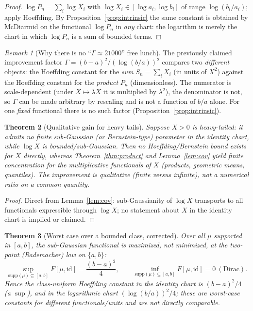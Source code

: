 \documentclass[11pt]{article}
\theoremstyle{plain}
\newtheorem{theorem}{Theorem}[section]
\theoremstyle{definition}
\theoremstyle{remark}
\newtheorem{remark}[theorem]{Remark}
\begin{document}
\begin{proof}
$\log P_n=\sum_i\log X_i$ with $\log X_i\in[\log a_i,\log b_i]$ of range
$\log(b_i/a_i)$; apply Hoeffding. By Proposition~\ref{prop:intrinsic} the same
constant is obtained by McDiarmid on the functional $\log P_n$ in \emph{any}
chart: the logarithm is merely the chart in which $\log P_n$ is a sum of bounded
terms.
\end{proof}

\begin{remark}[Why there is no ``$\Gamma\approx 21000$'' free lunch]
The previously claimed improvement factor $\Gamma=(b-a)^2/(\log(b/a))^2$ compares
two \emph{different} objects: the Hoeffding constant for the \emph{sum}
$S_n=\sum_iX_i$ (in units of $X^2$) against the Hoeffding constant for the
\emph{product} $P_n$ (dimensionless). The numerator is scale-dependent (under
$X\mapsto\lambda X$ it is multiplied by $\lambda^2$), the denominator is not, so
$\Gamma$ can be made arbitrary by rescaling and is not a function of $b/a$ alone.
For one \emph{fixed} functional there is no such factor
(Proposition~\ref{prop:intrinsic}).
\end{remark}

\begin{theorem}[Qualitative gain for heavy tails]\label{thm:heavy}
Suppose $X>0$ is heavy-tailed: it admits no finite sub-Gaussian (or
Bernstein-type) parameter in the identity chart, while $\log X$ is
bounded/sub-Gaussian. Then no Hoeffding/Bernstein bound exists for $X$ directly,
whereas Theorem~\ref{thm:product} and Lemma~\ref{lem:cov} yield finite
concentration for the multiplicative functionals of $X$ (products, geometric
means, quantiles). The improvement is \emph{qualitative} (finite versus infinite),
not a numerical ratio on a common quantity.
\end{theorem}

\begin{proof}
Direct from Lemma~\ref{lem:cov}: sub-Gaussianity of $\log X$ transports to all
functionals expressible through $\log X$; no statement about $X$ in the identity
chart is implied or claimed.
\end{proof}

\begin{theorem}[Worst case over a bounded class, corrected]\label{thm:minimax}
Over all $\mu$ supported in $[a,b]$, the sub-Gaussian functional is maximized,
not minimized, at the two-point (Rademacher) law on $\{a,b\}$:
\[
\sup_{\mathrm{supp}(\mu)\subseteq[a,b]} F[\mu,\mathrm{id}]=\frac{(b-a)^2}{4},
\qquad
\inf_{\mathrm{supp}(\mu)\subseteq[a,b]} F[\mu,\mathrm{id}]=0\ (\text{Dirac}).
\]
Hence the \emph{class-uniform} Hoeffding constant in the identity chart is
$(b-a)^2/4$ (a $\sup$), and in the logarithmic chart $(\log(b/a))^2/4$; these
are worst-case constants for \emph{different} functionals/units and are not
directly comparable.
\end{theorem}
\end{document}
